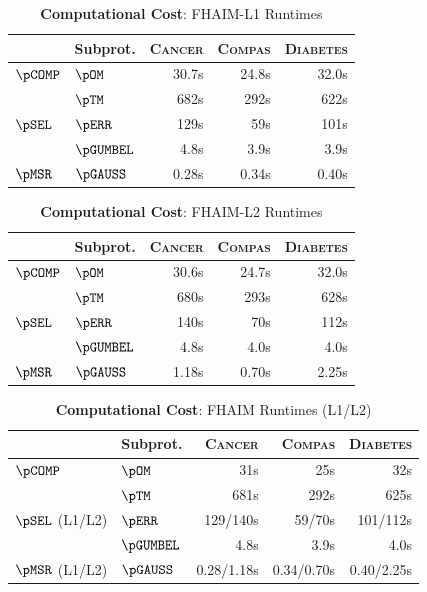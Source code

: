 \begin{table}[]
    \centering
    \footnotesize{
    \begin{tabular}{l l r r r}
    \toprule
         &  Subprot. & \textsc{Cancer} & \textsc{Compas} & \textsc{Diabetes}\\
    \midrule
        $\pCOMP$ & $\pOM$ & 30.7s & 24.8s & 32.0s \\
                  & $\pTM$ & 682s & 292s & 622s \\
    \midrule
        $\pSEL$ & $\pERR$ & 129s & 59s & 101s \\
                & $\pGUMBEL$ & 4.8s & 3.9s & 3.9s \\

    \midrule
        $\pMSR$ & $\pGAUSS$ & 0.28s & 0.34s & 0.40s \\
    \bottomrule
    \end{tabular}
    }
    \caption{\textbf{Computational Cost}: FHAIM-L1 Runtimes}
    \label{tab:runtimes-l1}
\end{table}

\begin{table}[]
    \centering
    \footnotesize{
    \begin{tabular}{l l r r r}
    \toprule
         &  Subprot. & \textsc{Cancer} & \textsc{Compas} & \textsc{Diabetes}\\
    \midrule
        $\pCOMP$ & $\pOM$ & 30.6s & 24.7s & 32.0s \\
                  & $\pTM$ & 680s & 293s & 628s \\
    \midrule
        $\pSEL$ & $\pERR$ & 140s & 70s & 112s \\
                & $\pGUMBEL$ & 4.8s & 4.0s & 4.0s \\

    \midrule
        $\pMSR$ & $\pGAUSS$ & 1.18s & 0.70s & 2.25s \\
    \bottomrule
    \end{tabular}
    }
    \caption{\textbf{Computational Cost}: FHAIM-L2 Runtimes}
    \label{tab:runtimes-l2}
\end{table}

\begin{table}[]
    \centering
    \footnotesize{
    \begin{tabular}{l l r r r}
    \toprule
         &  Subprot. & \textsc{Cancer} & \textsc{Compas} & \textsc{Diabetes}\\
    \midrule
        $\pCOMP$ & $\pOM$ & 31s & 25s & 32s \\
                  & $\pTM$ & 681s & 292s & 625s \\
    \midrule
        $\pSEL$ (L1/L2) & $\pERR$ & 129/140s & 59/70s & 101/112s \\
                & $\pGUMBEL$ & 4.8s & 3.9s & 4.0s \\

    \midrule
        $\pMSR$ (L1/L2) & $\pGAUSS$ & 0.28/1.18s & 0.34/0.70s & 0.40/2.25s \\
    \bottomrule
    \end{tabular}
    }
    \caption{\textbf{Computational Cost}: FHAIM Runtimes (L1/L2)}
    \label{tab:runtimes}
\end{table}
